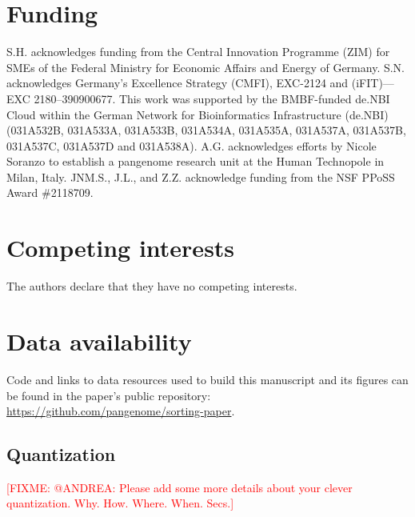 \documentclass{bioinfo}
\theoremstyle{definition}
\newcommand{\red}[1]{{\textcolor{Red}{#1}}}
\newcommand{\FIXME}[1]{\red{[FIXME: #1]}}
\begin{document}
    \section*{Funding}

    S.H. acknowledges funding from the Central Innovation Programme (ZIM) for SMEs of the Federal Ministry for Economic Affairs and Energy of Germany.
    S.N. acknowledges Germany’s Excellence Strategy (CMFI), EXC-2124 and (iFIT)—EXC 2180–390900677.
    This work was supported by the BMBF-funded de.NBI Cloud within the German Network for Bioinformatics Infrastructure (de.NBI) (031A532B, 031A533A, 031A533B, 031A534A, 031A535A, 031A537A, 031A537B, 031A537C, 031A537D and 031A538A).
    A.G. acknowledges efforts by Nicole Soranzo to establish a pangenome research unit at the Human Technopole in Milan, Italy.
    JNM.S., J.L., and Z.Z. acknowledge funding from the NSF PPoSS Award \#2118709.

    \section*{Competing interests}
    The authors declare that they have no competing interests.

    \section*{Data availability}

    Code and links to data resources used to build this manuscript and its figures can be found in the paper's public repository: \url{https://github.com/pangenome/sorting-paper}.

    

    

    \begin{appendices}
        \section{Quantization}
        \FIXME{@ANDREA: Please add some more details about your clever quantization. Why. How. Where. When. Secs.}
    \end{appendices}
\end{document}
